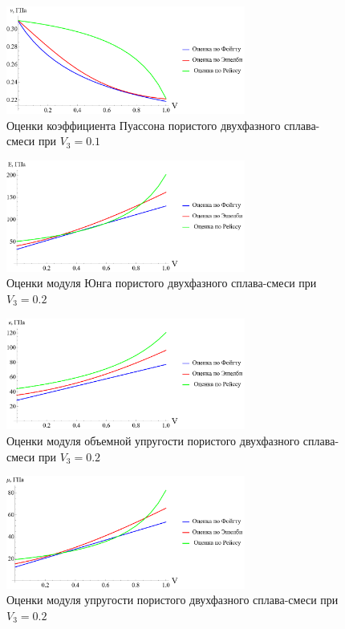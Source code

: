 \documentclass[12pt, a4paper]{article}
\begin{document}
\begin{figure}[!htbp]
	\centering
	\includegraphics[width=0.7\textwidth]{v-p-2}%
	\caption{Оценки коэффициента Пуассона пористого двухфазного сплава-смеси при $V_3 = 0.1$}
	\vspace*{-2mm}
	\label{puasson-pic-p-1}
\end{figure}
\begin{figure}[!htbp]
	\centering
	\includegraphics[width=0.7\textwidth]{e-p-3}%
	\caption{Оценки модуля Юнга пористого двухфазного сплава-смеси при $V_3 = 0.2$}
	\vspace*{-2mm}
	\label{puasson-pic-p-1}
\end{figure}
\begin{figure}[!htbp]
	\centering
	\includegraphics[width=0.7\textwidth]{k-p-3}%
	\caption{Оценки модуля объемной упругости пористого двухфазного сплава-смеси при $V_3 = 0.2$}
	\vspace*{-2mm}
	\label{puasson-pic-p-1}
\end{figure}
\begin{figure}[!htbp]
	\centering
	\includegraphics[width=0.7\textwidth]{nu-p-3}%
	\caption{Оценки модуля упругости пористого двухфазного сплава-смеси при $V_3 = 0.2$}
	\vspace*{-2mm}
	\label{puasson-pic-p-1}
\end{figure}
\end{document}
